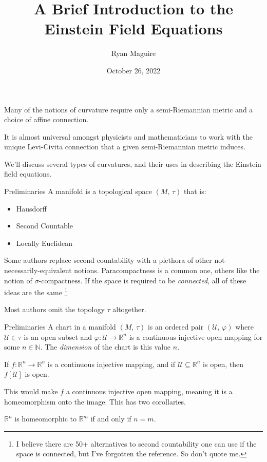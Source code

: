 \documentclass{beamer}
\title{A Brief Introduction to the Einstein Field Equations}
\author{Ryan Maguire}
\date{October 26, 2022}
\begin{document}
    \maketitle
    \begin{frame}
        Many of the notions of curvature require only a semi-Riemannian metric
        and a choice of affine connection.
        \par\hfill\par
        It is almost universal amongst physicists and mathematicians to work
        with the unique Levi-Civita connection that a given semi-Riemannian
        metric induces.
        \par\hfill\par
        We'll discuss several types of curvatures, and their uses in
        describing the Einstein field equations.
    \end{frame}
    \begin{frame}{Preliminaries}
        A manifold is a topological space $(M,\,\tau)$ that is:
        \begin{itemize}
            \item Hausdorff
            \item Second Countable
            \item Locally Euclidean
        \end{itemize}
        Some authors replace second countability with a plethora of other
        not-necessarily-equivalent notions. Paracompactness is a common one,
        others like the notion of $\sigma\textrm{-compactness}$. If the space
        is required to be \textit{connected}, all of these ideas are the same%
        \footnote{I believe there are 50+ alternatives to second countability
                  one can use if the space is connected, but I've forgotten the
                  reference. So don't quote me.}
        \par\hfill\par
        Most authors omit the topology $\tau$ altogether.
    \end{frame}
    \begin{frame}{Preliminaries}
        A chart in a manifold $(M,\,\tau)$ is an ordered pair
        $(\mathcal{U},\,\varphi)$ where $\mathcal{U}\in\tau$ is an open subset
        and $\varphi:\mathcal{U}\rightarrow\mathbb{R}^{n}$ is a continuous
        injective open mapping for some $n\in\mathbb{N}$. The \textit{dimension}
        of the chart is this value $n$.
        \begin{theorem}
            If $f:\mathbb{R}^{n}\rightarrow\mathbb{R}^{n}$ is a continuous
            injective mapping, and if $\mathcal{U}\subseteq\mathbb{R}^{n}$ is
            open, then $f[\mathcal{U}]$ is open.
        \end{theorem}
        This would make $f$ a continuous injective open mapping, meaning it is
        a homeomorphism onto the image. This has two corollaries.
        \begin{theorem}
            $\mathbb{R}^{n}$ is homeomorphic to $\mathbb{R}^{m}$ if and only if
            $n=m$.
        \end{theorem}
    \end{frame}
\end{document}
